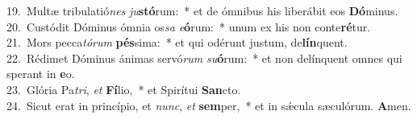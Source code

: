 {19.~}Multæ tribulatió\textit{nes} \textit{ju}\textbf{stó}rum:~* et de ómnibus his liberábit eos \textbf{Dó}minus.\\
{20.~}Custódit Dóminus ómnia os\textit{sa} \textit{e}\textbf{ó}rum:~* unum ex his non conte\textbf{ré}tur.\\
{21.~}Mors pecca\textit{tó}\textit{rum} \textbf{pés}sima:~* et qui odérunt justum, de\textbf{lín}quent.\\
{22.~}Rédimet Dóminus ánimas servó\textit{rum} \textit{su}\textbf{ó}rum:~* et non delínquent omnes qui sperant in \textbf{e}o.\\
{23.~}Glória Pa\textit{tri}, \textit{et} \textbf{Fí}lio,~* et Spirítui \textbf{San}cto.\\
{24.~}Sicut erat in princípio, et \textit{nunc}, \textit{et} \textbf{sem}per,~* et in sǽcula sæculórum. \textbf{A}men.\\
